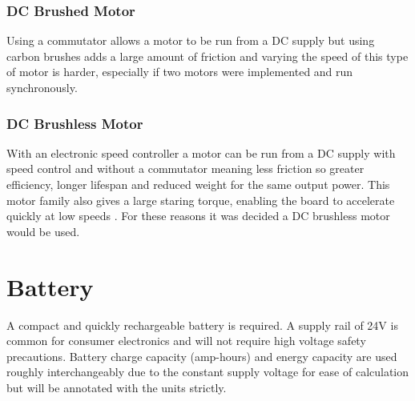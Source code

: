 \documentclass[journal,10pt]{IEEEtran}
\begin{document}
        \subsubsection{DC Brushed Motor}
            Using a commutator allows a motor to be run from a DC supply but using carbon brushes adds a large amount of friction and varying the speed of this type of motor is harder, especially if two motors were implemented and run synchronously.
        \subsubsection{DC Brushless Motor}
            With an electronic speed controller a motor can be run from a DC supply with speed control and without a commutator meaning less friction so greater efficiency, longer lifespan and reduced weight for the same output power. This motor family also gives a large staring torque, enabling the board to accelerate quickly at low speeds \cite{AC_Motor}. For these reasons it was decided a DC brushless motor would be used.
    \section{Battery}
    A compact and quickly rechargeable battery is required. A supply rail of 24V is common for consumer electronics and will not require high voltage safety precautions. Battery charge capacity (amp-hours) and energy capacity are used roughly interchangeably due to the constant supply voltage for ease of calculation but will be annotated with the units strictly.
\end{document}

